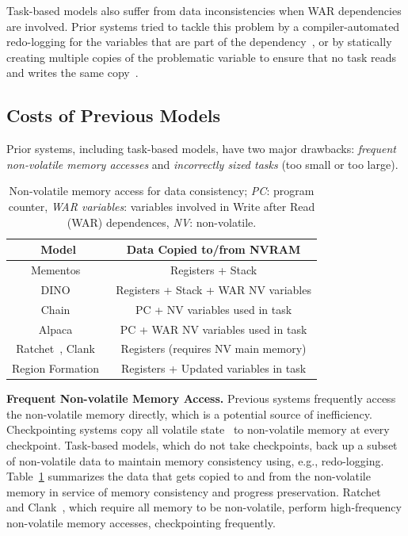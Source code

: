 Task-based models also suffer from data inconsistencies when WAR dependencies are involved. Prior systems tried to tackle this problem by a compiler-automated redo-logging for the variables that are part of the dependency~\cite{alpaca}, or by statically creating multiple copies of the problematic variable to ensure that no task reads and writes the same copy~\cite{chain}.

\subsection{Costs of Previous Models}
\label{sec:cost_task-based}

Prior systems, including task-based models, have two major drawbacks: {\em frequent non-volatile memory accesses} and {\em incorrectly sized tasks} (too small or too large).

\begin{table}
    \centering
    \footnotesize
    \begin{tabular}{|c|c|}
        \hline
        Model & Data Copied to/from NVRAM \\
        \hline\hline
        Mementos~\cite{mementos}	& Registers + Stack     \\
        DINO~\cite{dino}	& Registers + Stack + WAR NV variables \\%
        Chain~\cite{chain}	& PC + NV variables used in task\\
        Alpaca~\cite{alpaca}	& PC + WAR NV variables used in task\\
        Ratchet~\cite{ratchet}, Clank~\cite{hicks_isca_2017} & Registers (requires NV main memory) \\
        Region Formation~\cite{baghsorkhi_cgo_2018} & Registers + Updated variables in task \\
        \hline
    \end{tabular}
    \caption{Non-volatile memory access for data consistency; \emph{PC}: program counter, \emph{WAR variables}: variables involved in Write after Read (WAR) dependences, \emph{NV}: non-volatile.}
    \label{table:chechpoint_comparison}
\end{table}

\textbf{Frequent Non-volatile Memory Access.}   Previous systems frequently access the non-volatile memory directly, which is a potential source of inefficiency. Checkpointing systems copy all volatile state~\cite{dino, mementos, ratchet, hicks_isca_2017} to non-volatile memory at every checkpoint.  Task-based models, which do not take checkpoints, back up a subset of non-volatile data to maintain memory consistency using, e.g., redo-logging.  Table~\ref{table:chechpoint_comparison} summarizes the data that gets copied to and from the non-volatile memory in service of memory consistency and progress preservation.  Ratchet~\cite{ratchet} and Clank~\cite{hicks_isca_2017}, which require all memory to be non-volatile, perform high-frequency non-volatile memory accesses, checkpointing frequently.

